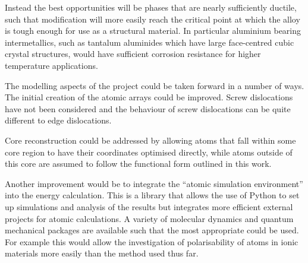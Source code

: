 Instead the best opportunities will be phases that are nearly sufficiently ductile, such that modification will more easily reach the critical point at which the alloy is tough enough for use as a structural material. In particular aluminium bearing intermetallics, such as tantalum aluminides which have large face-centred cubic crystal structures, would have sufficient corrosion resistance for higher temperature applications.

The modelling aspects of the project could be taken forward in a number of ways. The initial creation of the atomic arrays could be improved. Screw dislocations have not been considered and the behaviour of screw dislocations can be quite different to edge dislocations. 

Core reconstruction could be addressed by allowing atoms that fall within some core region to have their coordinates optimised directly, while atoms outside of this core are assumed to follow the functional form outlined in this work.

Another improvement would be to integrate the ``atomic simulation environment'' into the energy calculation. This is a library that allows the use of Python to set up simulations and analysis of the results but integrates more efficient external projects for atomic calculations. A variety of molecular dynamics and quantum mechanical packages are available such that the most appropriate could be used. For example this would allow the investigation of polarisability of atoms in ionic materials more easily than the method used thus far.

